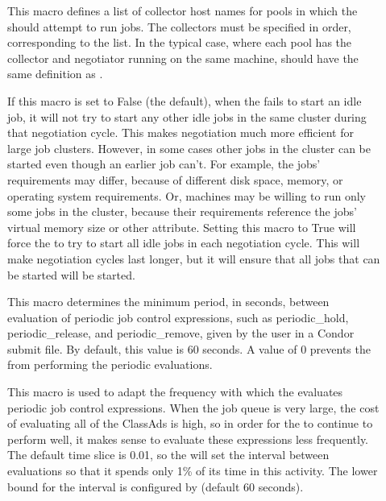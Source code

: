 \begin{description}
\item[] \label{param:FLockCollectorHosts}
  This macro defines a list of collector host names for pools in which
  the  should attempt to run jobs.  The
  collectors must be specified in order, corresponding to the
   list.  In the typical case, where each pool
  has the collector and negotiator running on the same machine,
   should have the same definition as
  .

\item[]
  \label{param:NegotiateAllJobsInCluster}
  If this macro is set to False (the default), when the  fails
  to start an idle job, it will not try to start any other
  idle jobs in the same cluster during that negotiation cycle.  This
  makes negotiation much more efficient for large job clusters.
  However, in some cases other jobs in the cluster can be started even
  though an earlier job can't.  For example, the jobs' requirements
  may differ, because of different disk space, memory, or
  operating system requirements.  Or, machines may be willing to run
  only some jobs in the cluster, because their requirements reference
  the jobs' virtual memory size or other attribute.  Setting this
  macro to True will force the  to try to start all idle jobs in
  each negotiation cycle.  This will make negotiation cycles last
  longer, but it will ensure that all jobs that can be started will be
  started.

\item[]
  \label{param:PeriodicExprInterval} This macro determines the minimum period,
  in seconds, between evaluation of periodic job control expressions,
  such as periodic\_hold, periodic\_release, and periodic\_remove,
  given by the user in a Condor submit file. By default, this value is
  60 seconds.  A value of 0 prevents the  from
  performing the periodic evaluations.

\item[]
  \label{param:PeriodicExprTimeslice} This macro is used to adapt the
  frequency with which the  evaluates periodic job
  control expressions.  When the job queue is very large, the cost of
  evaluating all of the ClassAds is high, so in order for the
   to continue to perform well, it makes sense to
  evaluate these expressions less frequently.  The default time slice
  is 0.01, so the  will set the interval between
  evaluations so that it spends only 1\% of its time in this activity.
  The lower bound for the interval is configured by
   (default 60 seconds).


\end{description}
